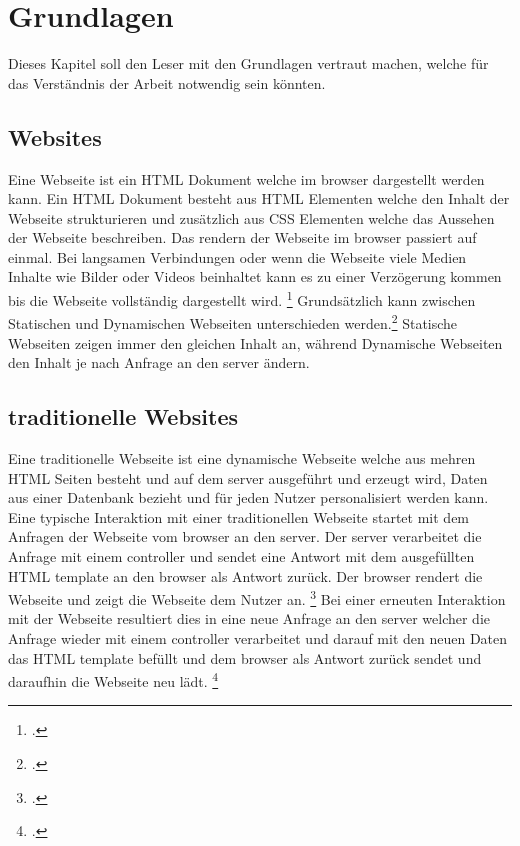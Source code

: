 \section{Grundlagen}
Dieses Kapitel soll den Leser mit den Grundlagen vertraut machen, welche für das Verständnis der Arbeit notwendig sein könnten.

\subsection{Websites}
Eine Webseite ist ein \ac{HTML} Dokument welche im \gls{browser} dargestellt werden kann.
Ein \ac{HTML} Dokument besteht aus \ac{HTML} Elementen welche den Inhalt der Webseite strukturieren und zusätzlich aus \ac{CSS} Elementen welche das Aussehen der Webseite beschreiben.
Das rendern der Webseite im \gls{browser} passiert auf einmal. Bei langsamen Verbindungen oder wenn die Webseite viele Medien Inhalte wie Bilder oder Videos beinhaltet kann es zu einer Verzögerung kommen bis die Webseite vollständig dargestellt wird. \footcite[Vgl.][Seite 27 - 31]{Robbins2018}
Grundsätzlich kann zwischen Statischen und Dynamischen Webseiten unterschieden werden.\footcite[Vgl.][Seite 25 - 27]{Robbins2018}
Statische Webseiten zeigen immer den gleichen Inhalt an, während Dynamische Webseiten den Inhalt je nach Anfrage an den \gls{server} ändern.

\subsection{traditionelle Websites}
Eine traditionelle Webseite ist eine dynamische Webseite welche aus mehren \ac{HTML} Seiten besteht und auf dem \gls{server} ausgeführt und erzeugt wird,
Daten aus einer Datenbank bezieht und für jeden Nutzer personalisiert werden kann.
Eine typische Interaktion mit einer traditionellen Webseite startet mit dem Anfragen der Webseite vom \gls{browser} an den \gls{server}.
Der \gls{server} verarbeitet die Anfrage mit einem \gls{controller} und sendet eine Antwort mit dem ausgefüllten \ac{HTML} \gls{template} an den \gls{browser} als Antwort zurück.
Der \gls{browser} rendert die Webseite und zeigt die Webseite dem Nutzer an. \footcite[Vgl.][Seite 32]{Robbins2018}
Bei einer erneuten Interaktion mit der Webseite resultiert dies in eine neue Anfrage an den \gls{server} welcher die Anfrage wieder mit einem \gls{controller} verarbeitet und darauf mit
den neuen Daten das \ac{HTML} \gls{template} befüllt und dem \gls{browser} als Antwort zurück sendet und daraufhin die Webseite neu lädt. \footcite[Vgl.][Seite 5]{Scott2015}

